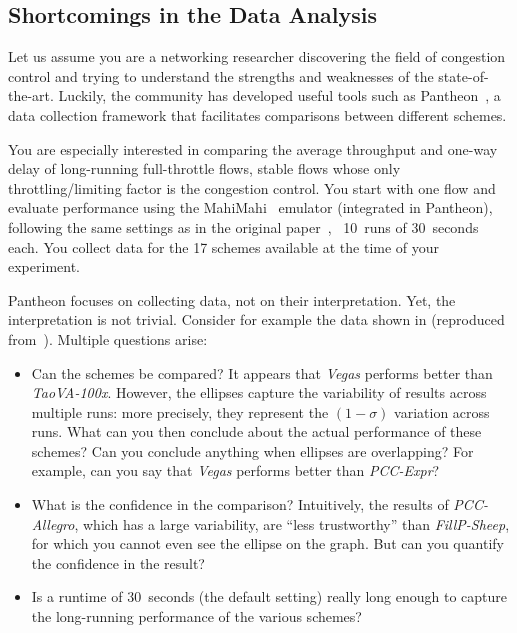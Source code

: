 \subsection{Shortcomings in the Data Analysis}
\label{subsec:triscale_intro_example}

Let us assume you are a networking researcher discovering the field of congestion control and trying to understand the strengths and weaknesses of the state-of-the-art.
Luckily, the community has developed useful tools such as Pantheon~\cite{yan18pantheon}, a data collection framework that facilitates comparisons between different schemes.

You are especially interested in comparing the average throughput and one-way delay of long-running full-throttle flows, \ie stable flows whose only throttling/limiting factor is the congestion control.
You start with one flow and evaluate performance using the MahiMahi~\cite{netravali2015mahimahi} emulator (integrated in Pantheon), following the same settings as in the original paper~\cite{yan18pantheon}, \ie~10~runs of 30~seconds each. You collect data for the 17 schemes available at the time of your experiment.

Pantheon focuses on collecting data, not on their interpretation. Yet, the interpretation is not trivial. Consider for example the data shown in  (reproduced from~\cite{yan18pantheon}). Multiple questions arise:

\begin{itemize}

    \item
    Can the schemes be compared?
    It appears that \textit{Vegas} performs better than \eg \textit{TaoVA-100x}.
    However, the ellipses capture the variability of results across multiple runs: more precisely, they represent the $(1-\sigma)$ variation across runs.
    What can you then conclude about the actual performance of these schemes?
    Can you conclude anything when ellipses are overlapping?
    For example, can you say that \textit{Vegas} performs better than \textit{PCC-Expr}?

    \item
    What is the confidence in the comparison? Intuitively, the results of \eg \textit{PCC-Allegro}, which has a large variability, are ``less trustworthy'' than \eg \textit{FillP-Sheep}, for which you cannot even see the ellipse on the graph. But can you quantify the confidence in the result?

    \item
    Is a runtime of 30~seconds (the default setting) really long enough to capture the long-running performance of the various schemes?

\end{itemize}


